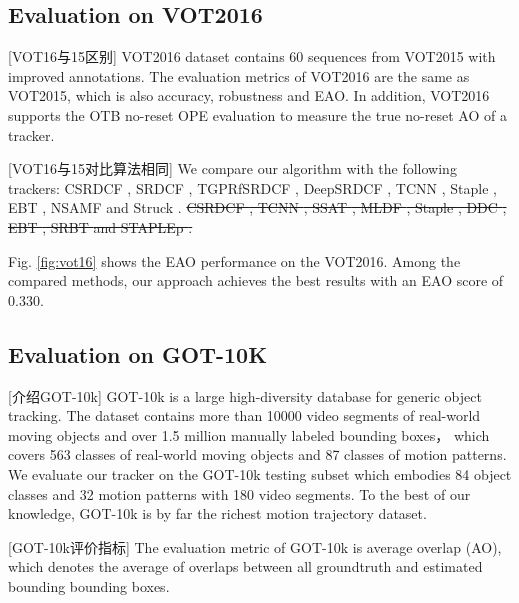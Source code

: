 \documentclass[review]{elsarticle}
\begin{document}
\begin{CJK*}{UTF8}{gbsn}
\subsection{Evaluation on VOT2016}
[VOT16与15区别] VOT2016 \cite{Kristan2016TheVO} dataset contains 60 sequences from VOT2015 with improved annotations. The evaluation metrics of VOT2016 are the same as VOT2015, which is also accuracy, robustness and EAO. In addition, VOT2016 supports the OTB no-reset OPE evaluation to measure the true no-reset AO of a tracker.

[VOT16与15对比算法相同] We compare our algorithm with the following trackers:
CSRDCF \cite{Lukezic2017DiscriminativeCF}, SRDCF \cite{Danelljan2015LearningSR}, TGPRfSRDCF \cite{gao2018tracking}, DeepSRDCF \cite{Danelljan2015ConvolutionalFF}, TCNN \cite{nam2016modeling}, Staple \cite{Bertinetto2016StapleC}, EBT \cite{Zhu2016BeyondLS},  NSAMF \cite{Hua2015OnlineOT} and Struck \cite{Hare2011StruckSO}.
\sout{CSRDCF \cite{Lukezic2017DiscriminativeCF}, TCNN \cite{Kristan2016TheVO}, SSAT \cite{Nam2016LearningMC}, MLDF \cite{Wang2015VisualTW}, Staple \cite{Bertinetto2016StapleC}, DDC \cite{Kristan2016TheVO}, EBT \cite{Zhu2016BeyondLS}, SRBT \cite{Kristan2016TheVO} and STAPLEp \cite{Bertinetto2016StapleC}.}

Fig. \ref{fig:vot16} shows the EAO performance on the VOT2016. Among the compared methods, our approach achieves the best results with an EAO score of 0.330.

\subsection{Evaluation on GOT-10K}
[介绍GOT-10k] GOT-10k \cite{Huang2018GOT10kAL} is a large high-diversity database for generic object tracking. The dataset contains more than 10000 video segments of real-world moving objects and over 1.5 million manually labeled bounding boxes， which covers 563 classes of real-world moving objects and 87 classes of motion patterns. We evaluate our tracker on the GOT-10k testing subset which embodies 84 object classes and 32 motion patterns with 180 video segments. To the best of our knowledge, GOT-10k is by far the richest motion trajectory dataset.

[GOT-10k评价指标] The evaluation metric of GOT-10k is average overlap (AO), which  denotes the average of overlaps between all groundtruth and estimated bounding bounding boxes. 


\end{CJK*}
\end{document}
